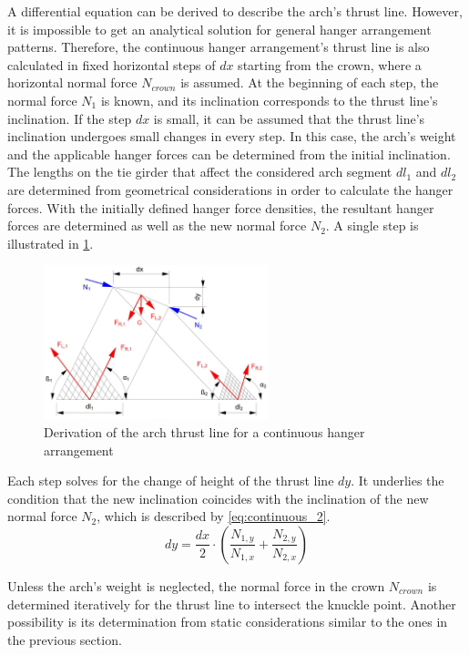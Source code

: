 A differential equation can be derived to describe the arch's thrust line. However, it is impossible to get an analytical solution for general hanger arrangement patterns. Therefore, the continuous hanger arrangement's thrust line is also calculated in fixed horizontal steps of $dx$ starting from the crown, where a horizontal normal force $N_{crown}$ is assumed. At the beginning of each step, the normal force $N_1$ is known, and its inclination corresponds to the thrust line's inclination. 
If the step $dx$ is small, it can be assumed that the thrust line's inclination undergoes small changes in every step. In this case, the arch's weight and the applicable hanger forces can be determined from the initial inclination. 
The lengths on the tie girder that affect the considered arch segment $dl_1$ and $dl_2$ are determined from geometrical considerations in order to calculate the hanger forces. With the initially defined hanger force densities, the resultant hanger forces are determined as well as the new normal force $N_2$. A single step is illustrated in \cref{fig:continuous_2}.

\begin{figure}[H]
    \centering
    \includegraphics[width=0.58\textwidth]{overleaf/Appendix/Pictures/continuous_thrust_line.PNG}
    \caption{Derivation of the arch thrust line for a continuous hanger arrangement}
    \label{fig:continuous_2}
\end{figure}

Each step solves for the change of height of the thrust line $dy$. It underlies the condition that the new inclination coincides with the inclination of the new normal force $N_2$, which is described by \cref{eq:continuous_2}.
\begin{equation}
    dy = \frac{dx}{2} \cdot \left(\frac{N_{1,y}}{N_{1,x}} + \frac{N_{2,y}}{N_{2,x}} \right)
    \label{eq:continuous_2}
\end{equation}


Unless the arch's weight is neglected, the normal force in the crown $N_{crown}$ is determined iteratively for the thrust line to intersect the knuckle point. Another possibility is its determination from static considerations similar to the ones in the previous section.


